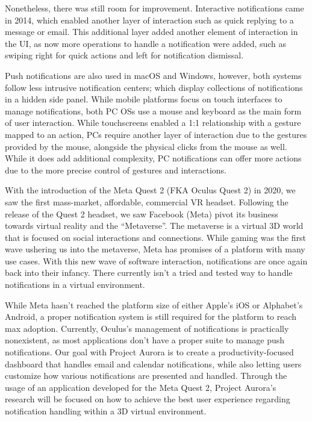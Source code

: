 \documentclass[acmlarge]{acmart}
\begin{document}
Nonetheless, there was still room for improvement. Interactive notifications came in 2014, which enabled another layer of interaction such as quick replying to a message or email. This additional layer added another element of interaction in the UI, as now more operations to handle a notification were added, such as swiping right for quick actions and left for notification dismissal. 

Push notifications are also used in macOS and Windows, however, both systems follow less intrusive notification centers; which display collections of notifications in a hidden side panel. While mobile platforms focus on touch interfaces to manage notifications, both PC OSs use a mouse and keyboard as the main form of user interaction. While touchscreens enabled a 1:1 relationship with a gesture mapped to an action, PCs require another layer of interaction due to the gestures provided by the mouse, alongside the physical clicks from the mouse as well. While it does add additional complexity, PC notifications can offer more actions due to the more precise control of gestures and interactions. 

With the introduction of the Meta Quest 2 (FKA Oculus Quest 2) in 2020, we saw the first mass-market, affordable, commercial VR headset. Following the release of the Quest 2 headset, we saw Facebook (Meta) pivot its business towards virtual reality and the “Metaverse”. The metaverse is a virtual 3D world that is focused on social interactions and connections. While gaming was the first wave ushering us into the metaverse, Meta has promises of a platform with many use cases. With this new wave of software interaction, notifications are once again back into their infancy. There currently isn’t a tried and tested way to handle notifications in a virtual environment.

While Meta hasn’t reached the platform size of either Apple’s iOS or Alphabet’s Android, a proper notification system is still required for the platform to reach max adoption. Currently, Oculus’s management of notifications is practically nonexistent, as most applications don’t have a proper suite to manage push notifications. Our goal with Project Aurora is to create a productivity-focused dashboard that handles email and calendar notifications, while also letting users customize how various notifications are presented and handled. Through the usage of an application developed for the Meta Quest 2, Project Aurora’s research will be focused on how to achieve the best user experience regarding notification handling within a 3D virtual environment.
\end{document}
